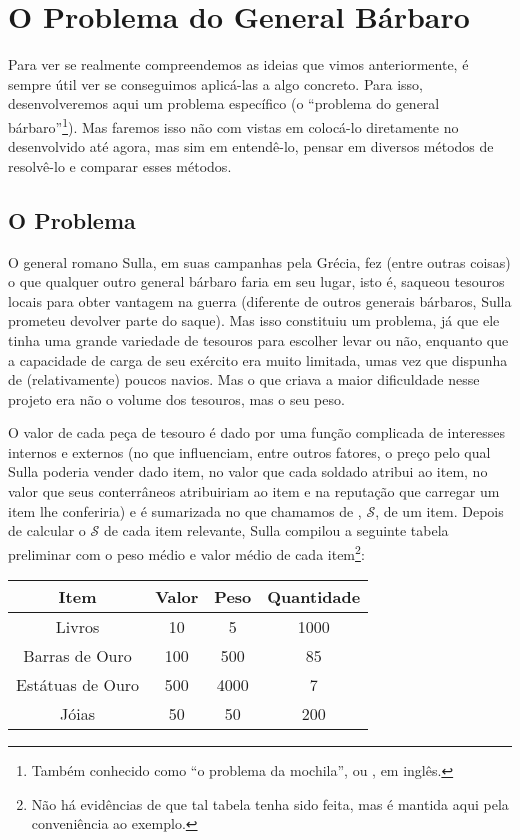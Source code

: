 \documentclass{article}
\begin{document}
\section{O Problema do General Bárbaro}

  Para ver se realmente compreendemos as ideias que vimos anteriormente, é sempre útil ver se
  conseguimos aplicá-las a algo concreto. Para isso, desenvolveremos aqui um problema específico (o
  ``problema do general bárbaro''\footnote{Também conhecido como ``o problema da mochila'', ou
  , em inglês.}). Mas faremos isso não com vistas em colocá-lo diretamente no
 desenvolvido até agora, mas sim em entendê-lo, pensar em diversos métodos de
resolvê-lo e comparar esses métodos.

\subsection{O Problema}

O general romano Sulla, em suas campanhas pela Grécia, fez (entre outras coisas) o que qualquer
outro general bárbaro faria em seu lugar, isto é, saqueou tesouros locais para obter vantagem na
guerra (diferente de outros
generais bárbaros, Sulla prometeu devolver parte do saque). Mas isso constituiu um problema,
já que ele tinha uma grande variedade de tesouros para escolher levar ou não, enquanto que a
capacidade de carga de seu exército era muito limitada, umas vez que dispunha de
(relativamente) poucos navios. Mas o que criava a maior dificuldade nesse projeto era não o volume
dos tesouros, mas o seu peso.

O valor de cada peça de tesouro é dado por uma função complicada de interesses internos e externos
(no que influenciam, entre outros fatores, o preço pelo qual Sulla poderia vender dado item, no valor que cada
soldado atribui ao item, no valor que seus conterrâneos atribuiriam ao item e na reputação que
carregar um item lhe conferiria) e
é sumarizada no que chamamos de , $\mathscr{S}$, de um item. Depois de calcular
o $\mathscr{S}$ de cada item relevante, Sulla compilou a seguinte tabela preliminar com o peso médio e valor
médio de cada item\footnote{Não há evidências de que tal tabela tenha sido feita, mas é mantida
  aqui pela conveniência ao exemplo.}:


\begin{center}
  \begin{tabular}{c|c|c|c}
    Item              & Valor  & Peso  & Quantidade\\
    \hline
    Livros            & 10     & 5     & 1000 \\
    Barras de Ouro    & 100    & 500   & 85 \\
    Estátuas de Ouro  & 500    & 4000  & 7 \\
    Jóias             & 50     & 50    & 200 \\
  \end{tabular}
\end{center}
\end{document}
